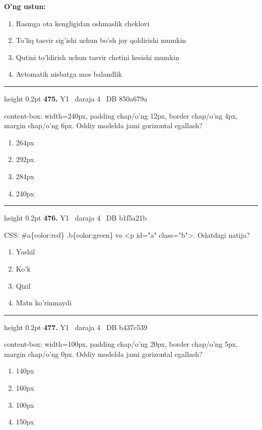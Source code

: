\documentclass[10pt,a4paper,oneside]{article}
\begin{document}
\textbf{\footnotesize O'ng ustun:}
\begin{enumerate}[label=\Alph*),leftmargin=9mm]
\item Rasmga ota kengligidan oshmaslik cheklovi
\item To'liq tasvir sig'ishi uchun bo'sh joy qoldirishi mumkin
\item Qutini to'ldirish uchun tasvir chetini kesishi mumkin
\item Avtomatik nisbatga mos balandlik
\end{enumerate}
\vspace{2mm}\hrule height 0.2pt \vspace{4mm}
\hypertarget{q475}{\textbf{\color{ink}475.}}  {\color{muted}\scriptsize Y1 \textbullet\ daraja 4 \textbullet\ DB 850a679a}
\par
content-box: width=240px, padding chap/o'ng 12px, border chap/o'ng 4px, margin chap/o'ng 6px. Oddiy modelda jami gorizontal egallash?
\begin{enumerate}[label=\Alph*),leftmargin=9mm]
\item 264px
\item 292px
\item 284px
\item 240px
\end{enumerate}
\vspace{2mm}\hrule height 0.2pt \vspace{4mm}
\hypertarget{q476}{\textbf{\color{ink}476.}}  {\color{muted}\scriptsize Y1 \textbullet\ daraja 4 \textbullet\ DB b1f5a21b}
\par
CSS: \#a\{color:red\} .b\{color:green\} va \textless{}p id="a" class="b"\textgreater{}. Odatdagi natija?
\begin{enumerate}[label=\Alph*),leftmargin=9mm]
\item Yashil
\item Ko'k
\item Qizil
\item Matn ko'rinmaydi
\end{enumerate}
\vspace{2mm}\hrule height 0.2pt \vspace{4mm}
\hypertarget{q477}{\textbf{\color{ink}477.}}  {\color{muted}\scriptsize Y1 \textbullet\ daraja 4 \textbullet\ DB b437c539}
\par
content-box: width=100px, padding chap/o'ng 20px, border chap/o'ng 5px, margin chap/o'ng 0px. Oddiy modelda jami gorizontal egallash?
\begin{enumerate}[label=\Alph*),leftmargin=9mm]
\item 140px
\item 160px
\item 100px
\item 150px
\end{enumerate}
\end{document}
